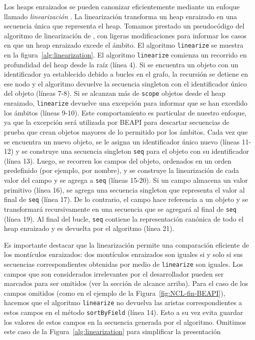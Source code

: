Los heaps enraizados se pueden canonizar eficientemente mediante un enfoque llamado \emph{linearización} \cite{Iosif02,Xie04}. La linearización transforma un heap enraizado en una secuencia única que representa el heap. Tomamos prestado un pseudocódigo del algoritmo de linearización de \cite{Xie04}, con ligeras modificaciones para informar los casos en que un heap enraizado excede el ámbito. El algoritmo \texttt{linearize} se muestra en la figura~\ref{alg:linearization}. El algoritmo \texttt{linearize} comienza un recorrido en profundidad del heap desde la raíz (línea 4). Si se encuentra un objeto con un identificador ya establecido debido a bucles en el grafo, la recursión se detiene en ese nodo y el algoritmo devuelve la secuencia singleton con el identificador único del objeto (líneas 7-8). Si se alcanzan más de \texttt{scope} objetos desde el heap enraizado, \texttt{linearize} devuelve una excepción para informar que se han excedido los ámbitos (líneas 9-10). Este comportamiento es particular de nuestro enfoque, ya que la excepción será utilizada por \textsf{BEAPI} para descartar secuencias de prueba que crean objetos mayores de lo permitido por los ámbitos. Cada vez que se encuentra un nuevo objeto, se le asigna un identificador único nuevo (líneas 11-12) y se construye una secuencia singleton \texttt{seq} para el objeto con su identificador (línea 13). Luego, se recorren los campos del objeto, ordenados en un orden predefinido (por ejemplo, por nombre), y se construye la linearización de cada valor del campo y se agrega a \texttt{seq} (líneas 15-20). Si un campo almacena un valor primitivo (línea 16), se agrega una secuencia singleton que representa el valor al final de \texttt{seq} (línea 17). De lo contrario, el campo hace referencia a un objeto y se transformará recursivamente en una secuencia que se agregará al final de \texttt{seq} (línea 19). Al final del bucle, \texttt{seq} contiene la representación canónica de todo el heap enraizado y es devuelta por el algoritmo (línea 21).

Es importante destacar que la linearización permite una comparación eficiente de los montículos enraizados: dos montículos enraizados son iguales si y solo si sus secuencias correspondientes obtenidas por medio de \texttt{linearize} son iguales. Los campos que son considerados irrelevantes por el desarrollador pueden ser marcados para ser omitidos (ver la sección de alcance arriba). Para el caso de los campos omitidos (como en el ejemplo de la Figura~\ref{fig:NCL-fin-BEAPI}), hacemos que el algoritmo \texttt{linearize} no devuelva las aristas correspondientes a estos campos en el método \texttt{sortByField} (línea 14). Esto a su vez evita guardar los valores de estos campos en la secuencia generada por el algoritmo. Omitimos este caso de la Figura~\ref{alg:linearization} para simplificar la presentación

